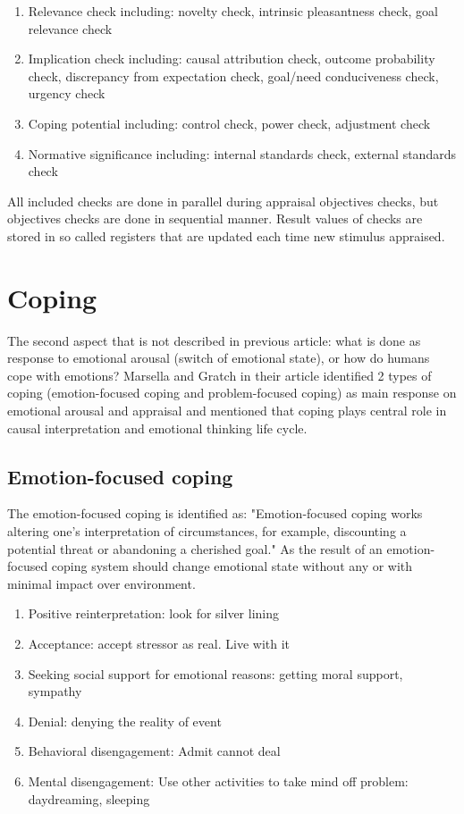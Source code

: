 \begin{enumerate}
 \item  Relevance check including: novelty check, intrinsic pleasantness check, goal relevance check
 \item  Implication check including: causal attribution check, outcome probability check, discrepancy from expectation check, goal/need conduciveness check, urgency check
 \item  Coping potential including: control check, power check, adjustment check
 \item  Normative significance including: internal standards check, external standards check
\end{enumerate}

All included checks are done in parallel during appraisal objectives checks, but objectives checks are done in sequential manner.
Result values of checks are stored in so called registers that are updated each time new stimulus appraised.

\section{Coping}

The second aspect that is not described in previous article: what is done as response to emotional arousal (switch of emotional state), or how do humans cope with emotions?
Marsella and Gratch in their article \cite{dont_worry_be_happy} identified 2 types of coping (emotion-focused coping and problem-focused coping) as main response on emotional arousal and appraisal and mentioned that coping plays central role in causal interpretation and emotional thinking life cycle.

\subsection{Emotion-focused coping}

The emotion-focused coping is identified as: "Emotion-focused coping works altering one’s interpretation of circumstances, for example, discounting a potential threat or abandoning a cherished goal." As the result of an emotion-focused coping system should change emotional state without any or with minimal impact over environment.

\begin{enumerate}
 \item  Positive reinterpretation: look for silver lining
 \item  Acceptance: accept stressor as real. Live with it
 \item  Seeking  social  support  for  emotional  reasons: getting moral support, sympathy
 \item  Denial: denying the reality of event
 \item  Behavioral disengagement: Admit cannot deal
 \item  Mental  disengagement:  Use  other  activities  to take mind off problem: daydreaming, sleeping
\end{enumerate}


